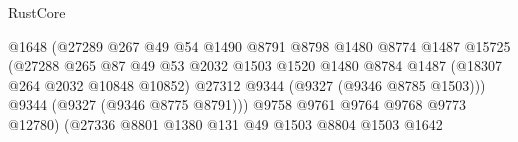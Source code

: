 \begin{lexlean}{RustCore}
\begin{coremodule}
                                                  @1648
                                                  (@27289
                                                    @267
                                                    @49
                                                    @54
                                                    @1490
                                                    @8791
                                                    @8798
                                                    @1480
                                                    @8774
                                                    @1487
                                                    @15725
                                                    (@27288
                                                      @265
                                                      @87
                                                      @49
                                                      @53
                                                      @2032
                                                      @1503
                                                      @1520
                                                      @1480
                                                      @8784
                                                      @1487
                                                      (@18307 @264 @2032 @10848 @10852)
                                                      @27312
                                                      @9344
                                                      (@9327 (@9346 @8785 @1503)))
                                                    @9344
                                                    (@9327 (@9346 @8775 @8791)))
                                                  @9758
                                                  @9761
                                                  @9764
                                                  @9768
                                                  @9773
                                                  @12780)
                                                (@27336
                                                  @8801
                                                  @1380
                                                  @131
                                                  @49
                                                  @1503
                                                  @8804
                                                  @1503
                                                  @1642

\end{coremodule}
\end{lexlean}
